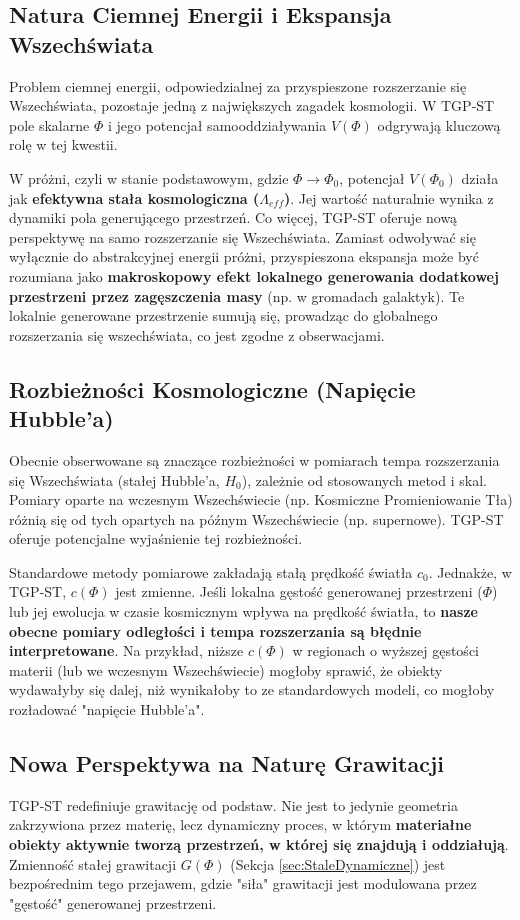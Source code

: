 \documentclass[11pt,a4paper]{article}
\begin{document}
\subsection{Natura Ciemnej Energii i Ekspansja Wszechświata}
Problem ciemnej energii, odpowiedzialnej za przyspieszone rozszerzanie się Wszechświata, pozostaje jedną z największych zagadek kosmologii. W TGP-ST pole skalarne $\Phi$ i jego potencjał samooddziaływania $V(\Phi)$ odgrywają kluczową rolę w tej kwestii.

W próżni, czyli w stanie podstawowym, gdzie $\Phi \rightarrow \Phi_0$, potencjał $V(\Phi_0)$ działa jak \textbf{efektywna stała kosmologiczna ($\Lambda_{eff}$)}. Jej wartość naturalnie wynika z dynamiki pola generującego przestrzeń. Co więcej, TGP-ST oferuje nową perspektywę na samo rozszerzanie się Wszechświata. Zamiast odwoływać się wyłącznie do abstrakcyjnej energii próżni, przyspieszona ekspansja może być rozumiana jako \textbf{makroskopowy efekt lokalnego generowania dodatkowej przestrzeni przez zagęszczenia masy} (np. w gromadach galaktyk). Te lokalnie generowane przestrzenie sumują się, prowadząc do globalnego rozszerzania się wszechświata, co jest zgodne z obserwacjami.

\subsection{Rozbieżności Kosmologiczne (Napięcie Hubble'a)}
Obecnie obserwowane są znaczące rozbieżności w pomiarach tempa rozszerzania się Wszechświata (stałej Hubble'a, $H_0$), zależnie od stosowanych metod i skal. Pomiary oparte na wczesnym Wszechświecie (np. Kosmiczne Promieniowanie Tła) różnią się od tych opartych na późnym Wszechświecie (np. supernowe). TGP-ST oferuje potencjalne wyjaśnienie tej rozbieżności.

Standardowe metody pomiarowe zakładają stałą prędkość światła $c_0$. Jednakże, w TGP-ST, $c(\Phi)$ jest zmienne. Jeśli lokalna gęstość generowanej przestrzeni ($\Phi$) lub jej ewolucja w czasie kosmicznym wpływa na prędkość światła, to \textbf{nasze obecne pomiary odległości i tempa rozszerzania są błędnie interpretowane}. Na przykład, niższe $c(\Phi)$ w regionach o wyższej gęstości materii (lub we wczesnym Wszechświecie) mogłoby sprawić, że obiekty wydawałyby się dalej, niż wynikałoby to ze standardowych modeli, co mogłoby rozładować "napięcie Hubble'a".

\subsection{Nowa Perspektywa na Naturę Grawitacji}
TGP-ST redefiniuje grawitację od podstaw. Nie jest to jedynie geometria zakrzywiona przez materię, lecz dynamiczny proces, w którym \textbf{materiałne obiekty aktywnie tworzą przestrzeń, w której się znajdują i oddziałują}. Zmienność stałej grawitacji $G(\Phi)$ (Sekcja \ref{sec:StaleDynamiczne}) jest bezpośrednim tego przejawem, gdzie "siła" grawitacji jest modulowana przez "gęstość" generowanej przestrzeni.
\end{document}
